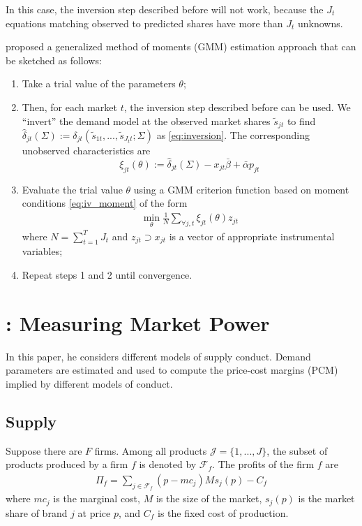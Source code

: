 \documentclass[11pt]{elegantbook}
\begin{document}
In this case, the inversion step described before will not work, because the $J_t$ equations matching observed to predicted shares have more than $J_t$ unknowns.

\cite{berry1995automobile} proposed a generalized method of moments (GMM) estimation approach that can be sketched as follows:
\begin{enumerate}
    \item Take a trial value of the parameters $\theta$;
    \item Then, for each market $t$, the inversion step described before can be used. We ``invert'' the demand model at the observed market shares $\tilde{s}_{jt}$ to find $\hat{\delta}_{jt}(\Sigma):=\delta_{jt}(\tilde{s}_{1t},...,\tilde{s}_{J_tt};\Sigma)$ as \eqref{eq:inversion}. The corresponding unobserved characteristics are $$\xi_{jt}(\theta):=\hat{\delta}_{jt}(\Sigma)-x_{jt}\bar{\beta}+\bar{\alpha}p_{jt}$$
    \item Evaluate the trial value $\theta$ using a GMM criterion function based on moment conditions \eqref{eq:iv_moment} of the form
    \begin{equation}
        \begin{aligned}
            \min_{\theta}\frac{1}{N}\sum_{\forall j,t}\xi_{jt}(\theta)z_{jt}
        \end{aligned}
        \nonumber
    \end{equation}
    where $N=\sum_{t=1}^T J_t$ and $z_{jt}\supset x_{jt}$ is a vector of  appropriate instrumental variables;
    \item Repeat steps 1 and 2 until convergence.
\end{enumerate}


\section{\cite{nevo2001measuring}: Measuring Market Power}
In this paper, he considers different models of supply conduct.  Demand parameters are estimated and used to compute the price-cost margins (PCM) implied by different models of conduct.

\subsection{Supply}
Suppose there are $F$ firms. Among all products $\mathcal{J}=\{1,...,J\}$, the subset of products produced by a firm $f$ is denoted by $\mathcal{F}_f$. The profits of the firm $f$ are
\begin{equation}
    \begin{aligned}
        \Pi_f=\sum_{j\in \mathcal{F}_f}(p-mc_j)Ms_j(p)-C_f
    \end{aligned}
    \nonumber
\end{equation}
where $mc_j$ is the marginal cost, $M$ is the size of the market, $s_j(p)$ is the market share of brand $j$ at price $p$, and $C_f$ is the fixed cost of production.
\end{document}
